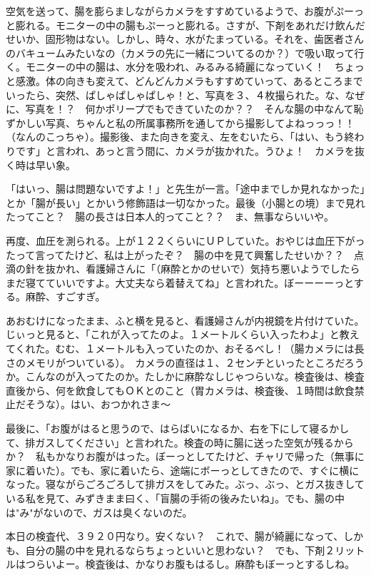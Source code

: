 空気を送って、腸を膨らましながらカメラをすすめているようで、お腹がぷーっと膨れる。モニターの中の腸もぷーっと膨れる。さすが、下剤をあれだけ飲んだせいか、固形物はない。しかし、時々、水がたまっている。それを、歯医者さんのバキュームみたいなの（カメラの先に一緒についてるのか？）で吸い取って行く。モニターの中の腸は、水分を吸われ、みるみる綺麗になっていく！　ちょっと感激。体の向きも変えて、どんどんカメラもすすめていって、あるところまでいったら、突然、ぱしゃぱしゃぱしゃ！と、写真を３、４枚撮られた。な、なぜに、写真を！？　何かポリープでもできていたのか？？　そんな腸の中なんて恥ずかしい写真、ちゃんと私の所属事務所を通してから撮影してよねっっっ！！（なんのこっちゃ）。撮影後、また向きを変え、左をむいたら、「はい、もう終わりです」と言われ、あっと言う間に、カメラが抜かれた。うひょ！　カメラを抜く時は早い象。

「はいっ、腸は問題ないですよ！」と先生が一言。「途中までしか見れなかった」とか「腸が長い」とかいう修飾語は一切なかった。最後（小腸との境）まで見れたってこと？　腸の長さは日本人的ってこと？？　ま、無事ならいいや。

再度、血圧を測られる。上が１２２くらいにＵＰしていた。おやじは血圧下がったって言ってたけど、私は上がったぞ？　腸の中を見て興奮したせいか？？　点滴の針を抜かれ、看護婦さんに「（麻酔とかのせいで）気持ち悪いようでしたらまだ寝てていいですよ。大丈夫なら着替えてね」と言われた。ぼーーーーっとする。麻酔、すごすぎ。

あおむけになったまま、ふと横を見ると、看護婦さんが内視鏡を片付けていた。じぃっと見ると、「これが入ってたのよ。１メートルくらい入ったわよ」と教えてくれた。むむ、１メートルも入っていたのか、おそるべし！（腸カメラには長さのメモリがついている）。　カメラの直径は１、２センチといったところだろうか。こんなのが入ってたのか。たしかに麻酔なしじゃつらいな。検査後は、検査直後から、何を飲食してもＯＫとのこと（胃カメラは、検査後、１時間は飲食禁止だそうな）。はい、おつかれさま～

最後に、「お腹がはると思うので、はらばいになるか、右を下にして寝るかして、排ガスしてください」と言われた。検査の時に腸に送った空気が残るからか？　私もかなりお腹がはった。ぼーっとしてたけど、チャリで帰った（無事に家に着いた）。でも、家に着いたら、途端にボーっとしてきたので、すぐに横になった。寝ながらごろごろして排ガスをしてみた。ぶっ、ぶっ、とガス抜きしている私を見て、みずきまま曰く、「盲腸の手術の後みたいね」。でも、腸の中は"み"がないので、ガスは臭くないのだ。

本日の検査代、３９２０円なり。安くない？　これで、腸が綺麗になって、しかも、自分の腸の中を見れるならちょっといいと思わない？　でも、下剤２リットルはつらいよー。検査後は、かなりお腹もはるし。麻酔もぼーっとするしね。


